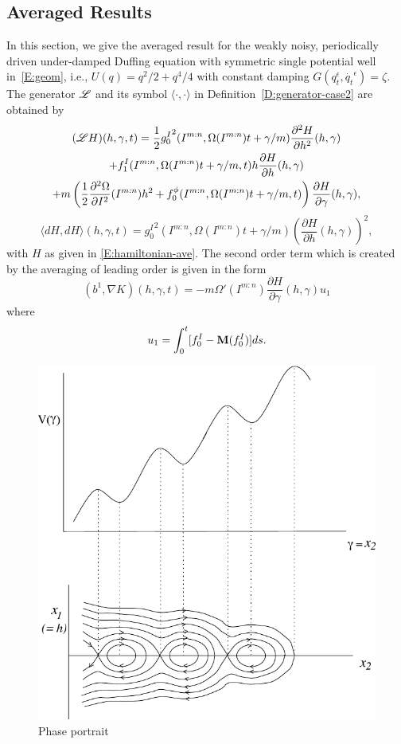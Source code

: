 \subsection{Averaged Results}
\label{Ss:Graph}

In this section, we give the averaged result for the weakly noisy, periodically driven under-damped Duffing equation with symmetric single potential well in~\eqref{E:geom}, i.e., $U(q)=q^2/2 + q^4/4$ with constant damping $G(q^\epsilon_t,\dot{q_t}^\epsilon) = \zeta$. The generator ${\mathscr L}$ and its symbol $\langle\cdot,\cdot\rangle$ in Definition~\ref{D:generator-case2} are obtained by
\begin{multline*}
(\mathscr L H)(h,\gamma,t) = \frac12 {g_0^I}^2(I^{m:n},\Omega(I^{m:n})t+\gamma/m)\frac{\partial^2 H}{\partial h^2}(h,\gamma)\\
+ f_1^I (I^{m:n},\Omega(I^{m:n})t+\gamma/m,t) h\frac{\partial H}{\partial h}(h,\gamma)\\
+ m \left(\frac12\frac{\partial^2 \Omega}{\partial I^2}(I^{m:n})h^2 +f_0^{\phi}(I^{m:n},
\Omega(I^{m:n})t+\gamma/m,t) \right)\frac{\partial H}{\partial \gamma}(h,\gamma),\\
\end{multline*}
\[
\langle dH,dH \rangle (h,\gamma,t) = {g_0^I}^2(I^{m:n},\Omega(I^{m:n})t+\gamma/m)\left(\frac{\partial H}{\partial h}(h,\gamma)\right)^2,
\]
with $H$ as given in \eqref{E:hamiltonian-ave}. The second order term which is created by the averaging of leading order is given in the form
\[
(b^1,\nabla K)(h,\gamma,t) = -m \Omega'(I^{m:n})\frac{\partial H}{\partial \gamma}(h,\gamma) u_1
\]
where
\[
u_1= \int_0^t [f_0^I - \operatorname{\mathbf M}(f_0^I)] ds.
\]
\begin{figure}
\begin{center}
\includegraphics[width=\textwidth*2/3]{figures/asme_portrait}
\end{center}
\caption{Phase portrait}
\label{F:phase2}
\end{figure}
